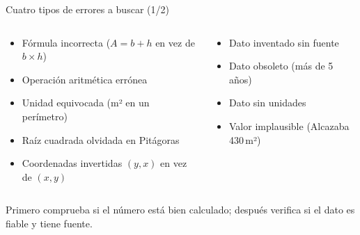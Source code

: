 \documentclass[aspectratio=169, 10pt, spanish]{beamer}
\begin{document}

\begin{frame}{Cuatro tipos de errores a buscar (1/2)}
  \begin{columns}[T]
    \begin{column}{0.48\textwidth}
      \begin{tcolorbox}[enhanced, colback=BRecordar!8,
        colframe=BRecordar, fonttitle=\bfseries\AlmFontSmall\color{AlmBlanco},
        title={\faCalculator\enskip Errores matemáticos},
        attach boxed title to top left={yshift=-2.2mm, xshift=4mm},
        boxed title style={colback=BRecordar, arc=3pt},
        arc=4pt, leftrule=4pt]
        \AlmFontFootnote
        \begin{itemize}
          \item Fórmula incorrecta ($A = b + h$ en vez de $b \times h$)
          \item Operación aritmética errónea
          \item Unidad equivocada (m² en un perímetro)
          \item Raíz cuadrada olvidada en Pitágoras
          \item Coordenadas invertidas $(y,x)$ en vez de $(x,y)$
        \end{itemize}
      \end{tcolorbox}
    \end{column}
    \begin{column}{0.48\textwidth}
      \begin{tcolorbox}[enhanced, colback=BAnalizar!8,
        colframe=BAnalizar, fonttitle=\bfseries\AlmFontSmall\color{AlmBlanco},
        title={\faDatabase\enskip Errores de datos},
        attach boxed title to top left={yshift=-2.2mm, xshift=4mm},
        boxed title style={colback=BAnalizar, arc=3pt},
        arc=4pt, leftrule=4pt]
        \AlmFontFootnote
        \begin{itemize}
          \item Dato inventado sin fuente
          \item Dato obsoleto (más de 5 años)
          \item Dato sin unidades
          \item Valor implausible (Alcazaba 430\,m²)
        \end{itemize}
      \end{tcolorbox}
    \end{column}
  \end{columns}
  \vspace{6pt}
  \begin{notabox}
    \AlmFontFootnote
    Primero comprueba si el número está bien calculado;
    después verifica si el dato es fiable y tiene fuente.
  \end{notabox}
\end{frame}
\end{document}
